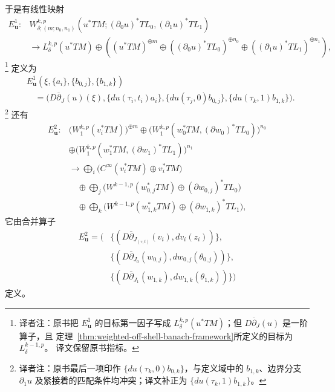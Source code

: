 于是有线性映射
\[
\begin{aligned}
 E_{\mathbf u}^1:
 &W_{\delta;(m;n_0,n_1)}^{k,p}
 (u^*TM;(\partial_0u)^*TL_0,(\partial_1u)^*TL_1)\\
 &\longrightarrow L_\delta^{k,p}(u^*TM)\oplus
 \left((u^*TM)^{\oplus m}\oplus((\partial_0u)^*TL_0)^{\oplus n_0}
 \oplus((\partial_1u)^*TL_1)^{\oplus n_1}\right),
\end{aligned}
\]
\footnote{译者注：原书把 $E_{\mathbf u}^1$ 的目标第一因子写成
$L_\delta^{k,p}(u^*TM)$；但 $D\overline\partial_J(u)$ 是一阶算子，且
定理~\ref{thm:weighted-off-shell-banach-framework}所定义的目标为 $L_\delta^{k-1,p}$。
译文保留原书指标。}
定义为
\[
\begin{aligned}
 &E_{\mathbf u}^1(\xi,\{a_i\},\{b_{0,j}\},\{b_{1,k}\})\\
 &\quad=\bigl(D\overline\partial_J(u)(\xi),
 \{du(\tau_i,t_i)a_i\},
 \{du(\tau_j,0)b_{0,j}\},
 \{du(\tau_k,1)b_{1,k}\}\bigr).
\end{aligned}
\]
\footnote{译者注：原书最后一项印作 $\{du(\tau_k,0)b_{0,k}\}$，与定义域中的
$b_{1,k}$、边界分支 $\partial_1u$ 及紧接着的匹配条件均冲突；译文补正为
$\{du(\tau_k,1)b_{1,k}\}$。}
还有
\[
\begin{aligned}
 E_{\mathbf u}^2:
 &\bigl(W_1^{k,p}(v_i^*TM)\bigr)^{\oplus m}
 \oplus\bigl(W_1^{k,p}(w_0^*TM,(\partial w_0)^*TL_0)\bigr)^{n_0}\\
 &\oplus\bigl(W_1^{k,p}(w_1^*TM,(\partial w_1)^*TL_1)\bigr)^{n_1}\\
 &\longrightarrow\bigoplus_i\bigl(C^\infty(v_i^*TM)\oplus v_i^*TM\bigr)\\
 &\quad\oplus\bigoplus_j\bigl(W^{k-1,p}(w_{0,j}^*TM)
 \oplus(\partial w_{0,j})^*TL_0\bigr)\\
 &\quad\oplus\bigoplus_k\bigl(W^{k-1,p}(w_{1,k}^*TM)
 \oplus(\partial w_{1,k})^*TL_1\bigr),
\end{aligned}
\]
它由合并算子
\[
\begin{aligned}
 E_{\mathbf u}^2=\bigl(&\{(D\overline\partial_{J_{(\tau,t)}}(v_i),dv_i(z_i))\},\\
 &\{(D\overline\partial_{J_0}(w_{0,j}),dw_{0,j}(\theta_{0,j}))\},\\
 &\{(D\overline\partial_{J_1}(w_{1,k}),dw_{1,k}(\theta_{1,k}))\}\bigr)
\end{aligned}
\]
定义。

